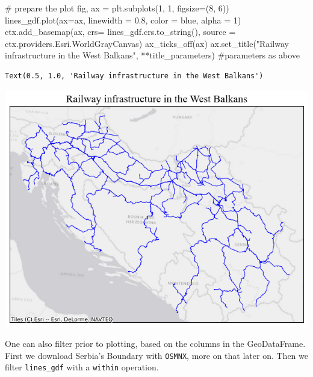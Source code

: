 \documentclass[
  letterpaper,
  DIV=11,
  numbers=noendperiod]{scrreprt}
\newenvironment{Shaded}{\begin{snugshade}}{\end{snugshade}}
\newcommand{\CommentTok}[1]{\textcolor[rgb]{0.37,0.37,0.37}{#1}}
\newcommand{\DecValTok}[1]{\textcolor[rgb]{0.68,0.00,0.00}{#1}}
\newcommand{\FloatTok}[1]{\textcolor[rgb]{0.68,0.00,0.00}{#1}}
\newcommand{\NormalTok}[1]{\textcolor[rgb]{0.00,0.23,0.31}{#1}}
\newcommand{\OperatorTok}[1]{\textcolor[rgb]{0.37,0.37,0.37}{#1}}
\newcommand{\StringTok}[1]{\textcolor[rgb]{0.13,0.47,0.30}{#1}}
\begin{document}
\begin{Shaded}
\begin{Highlighting}[]
\CommentTok{\# prepare the plot}
\NormalTok{fig, ax }\OperatorTok{=}\NormalTok{ plt.subplots(}\DecValTok{1}\NormalTok{, }\DecValTok{1}\NormalTok{, figsize}\OperatorTok{=}\NormalTok{(}\DecValTok{8}\NormalTok{, }\DecValTok{6}\NormalTok{))}
\NormalTok{lines\_gdf.plot(ax}\OperatorTok{=}\NormalTok{ax, linewidth }\OperatorTok{=} \FloatTok{0.8}\NormalTok{, color }\OperatorTok{=} \StringTok{\textquotesingle{}blue\textquotesingle{}}\NormalTok{, alpha }\OperatorTok{=} \DecValTok{1}\NormalTok{)}
\NormalTok{ctx.add\_basemap(ax, crs}\OperatorTok{=}\NormalTok{ lines\_gdf.crs.to\_string(), source }\OperatorTok{=}\NormalTok{ ctx.providers.Esri.WorldGrayCanvas)}
\NormalTok{ax\_ticks\_off(ax)}
\NormalTok{ax.set\_title(}\StringTok{"Railway infrastructure in the West Balkans"}\NormalTok{, }\OperatorTok{**}\NormalTok{title\_parameters) }\CommentTok{\#parameters as above}
\end{Highlighting}
\end{Shaded}

\begin{verbatim}
Text(0.5, 1.0, 'Railway infrastructure in the West Balkans')
\end{verbatim}

\includegraphics{labs/w02_maps_files/figure-pdf/cell-11-output-2.png}

One can also filter prior to plotting, based on the columns in the
GeoDataFrame. First we download Serbia's Boundary with \texttt{OSMNX},
more on that later on. Then we filter \texttt{lines\_gdf} with a
\texttt{within} operation.
\end{document}
